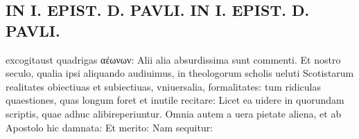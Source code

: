 \documentclass{article}
\begin{document}
\begin{pages}
\section*{IN I. EPIST. D. PAVLI. IN I. EPIST. D. PAVLI. }
\marginpar{[ p.123 ]}\pstart excogitaust quadrigas αἐωνων: Alii alia absurdissima sunt commenti. Et nostro seculo, qualia ipsi aliquando audiuimus, in theologorum scholis ueluti Scotistarum realitates obiectiuas et subiectiuas, vniuersalia, formalitates: tum ridiculas quaestiones, quas longum foret et inutile recitare: Licet ea uidere in quorundam scriptis, quae adhuc alibireperiuntur. Omnia autem a uera pietate aliena, et ab Apostolo hic damnata: Et merito: Nam sequitur:  \pend
{}
{}

\end{pages}
\end{document}
